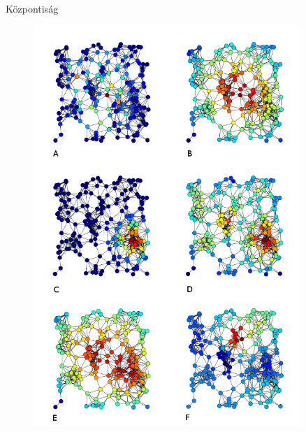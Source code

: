 \documentclass{beamer}
\newlength{\sepwid}
\newlength{\onecolwid}
\newlength{\twocolwid}
\begin{document}
\begin{frame}[t]
\begin{columns}[t]
\begin{column}{\twocolwid}
      \begin{columns} %
        \begin{column}{\onecolwid}
          \bigskip

        \end{column}
      \end{columns}

    \end{column}

    \begin{column}{\sepwid} \end{column}   %

      \begin{column}{\onecolwid} %

        \begin{block}{Központiság}
          \begin{figure}
            \includegraphics{img/6_centrality_measures}


\end{figure}
\end{block}
\end{column}
\end{columns}
\end{frame}
\end{document}
